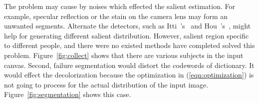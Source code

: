 {The problem may cause by noises which effected the salient estimation.
For example, specular reflection or the stain on the camera lens may form
an unwanted segments.
Alternate the detectors, such as Itti~\etal's~\cite{Itti:1998:AMS} and 
Hou~\etal's~\cite{Hou:2012:ISH}, might help for generating different
salient distribution.
However, salient region specific to different people, and there were no
existed methods have completed solved this problem.
Figure~\ref{fig:collect} shows that there are various subjects in the input canvas.
Second, failure segmentation would distort the codewords of dictionary.
It would effect the decolorization because the optimization in (\ref{eqn:optimization})
is not going to process for the actual distribution of the input image.
Figure~\ref{fig:segmentation} shows this case.
}
